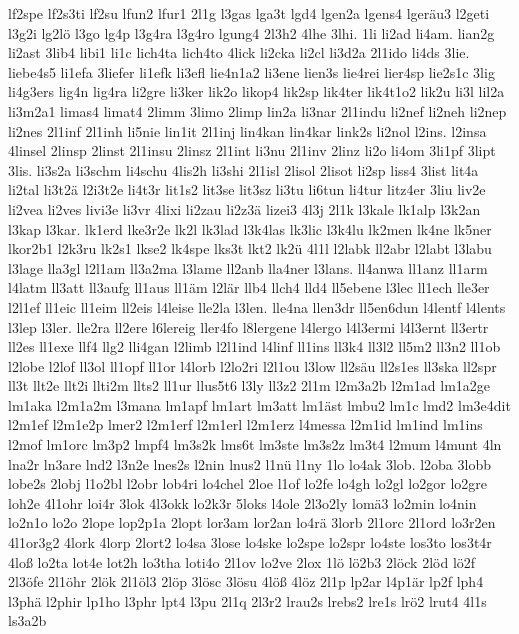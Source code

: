 {lf2spe
lf2s3ti
lf2su
lfun2
lfur1
2l1g
l3gas
lga3t
lgd4
lgen2a
lgens4
lgeräu3
l2geti
l3g2i
lg2lö
l3go
lg4p
l3g4ra
l3g4ro
lgung4
2l3h2
4lhe
3lhi.
1li
li2ad
li4am.
lian2g
li2ast
3lib4
libi1
li1c
lich4ta
lich4to
4lick
li2cka
li2cl
li3d2a
2l1ido
li4ds
3lie.
liebe4s5
li1efa
3liefer
li1efk
li3efl
lie4n1a2
li3ene
lien3s
lie4rei
lier4sp
lie2s1c
3lig
li4g3ers
lig4n
lig4ra
li2gre
li3ker
lik2o
likop4
lik2sp
lik4ter
lik4t1o2
lik2u
li3l
lil2a
li3m2a1
limas4
limat4
2limm
3limo
2limp
lin2a
li3nar
2l1indu
li2nef
li2neh
li2nep
li2nes
2l1inf
2l1inh
li5nie
lin1it
2l1inj
lin4kan
lin4kar
link2s
li2nol
l2ins.
l2insa
4linsel
2linsp
2linst
2l1insu
2linsz
2l1int
li3nu
2l1inv
2linz
li2o
li4om
3li1pf
3lipt
3lis.
li3s2a
li3schm
li4schu
4lis2h
li3shi
2l1isl
2lisol
2lisot
li2sp
liss4
3list
lit4a
li2tal
li3t2ä
l2i3t2e
li4t3r
lit1s2
lit3se
lit3sz
li3tu
li6tun
li4tur
litz4er
3liu
liv2e
li2vea
li2ves
livi3e
li3vr
4lixi
li2zau
li2z3ä
lizei3
4l3j
2l1k
l3kale
lk1alp
l3k2an
l3kap
l3kar.
lk1erd
lke3r2e
lk2l
lk3lad
l3k4las
lk3lic
l3k4lu
lk2men
lk4ne
lk5ner
lkor2b1
l2k3ru
lk2s1
lkse2
lk4spe
lks3t
lkt2
lk2ü
4l1l
l2labk
ll2abr
l2labt
l3labu
l3lage
lla3gl
l2l1am
ll3a2ma
l3lame
ll2anb
lla4ner
l3lans.
ll4anwa
ll1anz
ll1arm
l4latm
ll3att
ll3aufg
ll1aus
ll1äm
l2lär
llb4
llch4
lld4
ll5ebene
l3lec
ll1ech
lle3er
l2l1ef
ll1eic
ll1eim
ll2eis
l4leise
lle2la
l3len.
lle4na
llen3dr
ll5en6dun
l4lentf
l4lents
l3lep
l3ler.
lle2ra
ll2ere
l6lereig
ller4fo
l8lergene
l4lergo
l4l3ermi
l4l3ernt
ll3ertr
ll2es
ll1exe
llf4
llg2
lli4gan
l2limb
l2l1ind
l4linf
ll1ins
ll3k4
ll3l2
ll5m2
ll3n2
ll1ob
l2lobe
l2lof
ll3ol
ll1opf
ll1or
l4lorb
l2lo2ri
l2l1ou
l3low
ll2säu
ll2s1es
ll3ska
ll2spr
ll3t
llt2e
llt2i
llti2m
llts2
ll1ur
llus5t6
l3ly
ll3z2
2l1m
l2m3a2b
l2m1ad
lm1a2ge
lm1aka
l2m1a2m
l3mana
lm1apf
lm1art
lm3att
lm1äst
lmbu2
lm1c
lmd2
lm3e4dit
l2m1ef
l2m1e2p
lmer2
l2m1erf
l2m1erl
l2m1erz
l4messa
l2m1id
lm1ind
lm1ins
l2mof
lm1orc
lm3p2
lmpf4
lm3s2k
lms6t
lm3ste
lm3s2z
lm3t4
l2mum
l4munt
4ln
lna2r
ln3are
lnd2
l3n2e
lnes2s
l2nin
lnus2
l1nü
l1ny
1lo
lo4ak
3lob.
l2oba
3lobb
lobe2s
2lobj
l1o2bl
l2obr
lob4ri
lo4chel
2loe
l1of
lo2fe
lo4gh
lo2gl
lo2gor
lo2gre
loh2e
4l1ohr
loi4r
3lok
4l3okk
lo2k3r
5loks
l4ole
2l3o2ly
lomä3
lo2min
lo4nin
lo2n1o
lo2o
2lope
lop2p1a
2lopt
lor3am
lor2an
lo4rä
3lorb
2l1orc
2l1ord
lo3r2en
4l1or3g2
4lork
4lorp
2lort2
lo4sa
3lose
lo4ske
lo2spe
lo2spr
lo4ste
los3to
los3t4r
4loß
lo2ta
lot4e
lot2h
lo3tha
loti4o
2l1ov
lo2ve
2lox
1lö
lö2b3
2löck
2löd
lö2f
2l3öfe
2l1öhr
2lök
2l1öl3
2löp
3lösc
3lösu
4löß
4löz
2l1p
lp2ar
l4p1är
lp2f
lph4
l3phä
l2phir
lp1ho
l3phr
lpt4
l3pu
2l1q
2l3r2
lrau2s
lrebs2
lre1s
lrö2
lrut4
4l1s
ls3a2b
}
